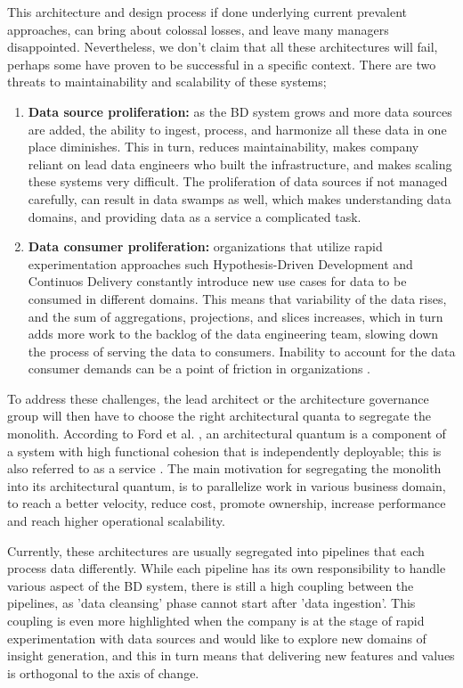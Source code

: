 \documentclass[review]{elsarticle}
\begin{document}
This architecture and design process if done underlying current prevalent approaches, can bring about colossal losses, and leave many managers disappointed. Nevertheless, we don't claim that all these architectures will fail, perhaps some have proven to be successful in a specific context. There are two threats to maintainability and scalability of these systems;

\begin{enumerate}
    \item \textbf{Data source proliferation:} as the BD system grows and more data sources are added, the ability to ingest, process, and harmonize all these data in one place diminishes. This in turn, reduces maintainability, makes company reliant on lead data engineers who built the infrastructure, and makes scaling these systems very difficult. The proliferation of data sources if not managed carefully, can result in data swamps as well, which makes understanding data domains, and providing data as a service a complicated task.
    \item \textbf{Data consumer proliferation:} organizations that utilize rapid experimentation approaches such Hypothesis-Driven Development and Continuos Delivery \cite{hypothesisDev} constantly introduce new use cases for data to be consumed in different domains. This means that variability of the data rises, and the sum of aggregations, projections, and slices increases, which in turn adds more work to the backlog of the data engineering team, slowing down the process of serving the data to consumers. Inability to account for the data consumer demands can be a point of friction in organizations \cite{monolithToMesh}. 
\end{enumerate}

To address these challenges, the lead architect or the architecture governance group will then have to choose the right architectural quanta to segregate the monolith. According to Ford et al. \cite{ford2017building}, an architectural quantum is a component of a system with high functional cohesion that is independently deployable; this is also referred to as a service \cite{newman2021building}. The main motivation for segregating the monolith into its architectural quantum, is to parallelize work in various business domain, to reach a better velocity, reduce cost, promote ownership, increase performance and reach higher operational scalability.

Currently, these architectures are usually segregated into pipelines that each process data differently. While each pipeline has its own responsibility to handle various aspect of the BD system, there is still a high coupling between the pipelines, as 'data cleansing' phase cannot start after 'data ingestion'. This coupling is even more highlighted when the company is at the stage of rapid experimentation with data sources and would like to explore new domains of insight generation, and this in turn means that delivering new features and values is orthogonal to the axis of change.
\end{document}
